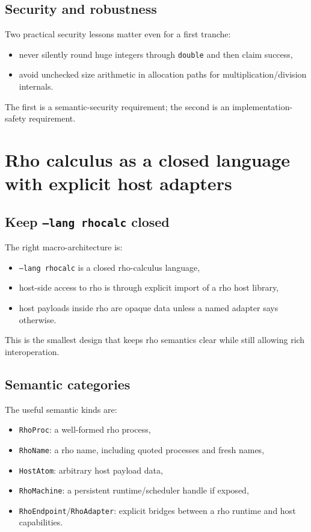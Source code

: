 \documentclass[11pt]{article}
\begin{document}
\subsection{Security and robustness}

Two practical security lessons matter even for a first tranche:
\begin{itemize}
    \item never silently round huge integers through \texttt{double} and then claim success,
    \item avoid unchecked size arithmetic in allocation paths for multiplication/division internals.
\end{itemize}

The first is a semantic-security requirement; the second is an implementation-safety requirement.

\section{Rho calculus as a closed language with explicit host adapters}

\subsection{Keep \texttt{--lang rhocalc} closed}

The right macro-architecture is:
\begin{itemize}
    \item \texttt{--lang rhocalc} is a closed rho-calculus language,
    \item host-side access to rho is through explicit import of a rho host library,
    \item host payloads inside rho are opaque data unless a named adapter says otherwise.
\end{itemize}

This is the smallest design that keeps rho semantics clear while still allowing rich interoperation.

\subsection{Semantic categories}

The useful semantic kinds are:
\begin{itemize}
    \item \texttt{RhoProc}: a well-formed rho process,
    \item \texttt{RhoName}: a rho name, including quoted processes and fresh names,
    \item \texttt{HostAtom}: arbitrary host payload data,
    \item \texttt{RhoMachine}: a persistent runtime/scheduler handle if exposed,
    \item \texttt{RhoEndpoint}/\texttt{RhoAdapter}: explicit bridges between a rho runtime and host capabilities.
\end{itemize}
\end{document}
